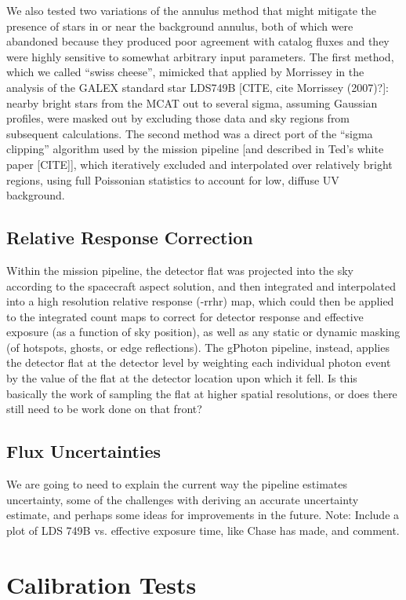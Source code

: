 \documentclass[5p]{elsarticle}
\begin{document}
We also tested two variations of the annulus method that might mitigate the presence of stars in or near the background annulus, both of which were abandoned because they produced poor agreement with catalog fluxes and they were highly sensitive to somewhat arbitrary input parameters. The first method, which we called ``swiss cheese'', mimicked that applied by {\color{red}Morrissey in the analysis of the GALEX standard star LDS749B [CITE, cite Morrissey (2007)?]}: nearby bright stars from the MCAT out to several sigma, assuming Gaussian profiles, were masked out by excluding those data and sky regions from subsequent calculations. The second method was a direct port of the ``sigma clipping'' algorithm used by the mission pipeline {\color{red}[and described in Ted's white paper [CITE]]}, which iteratively excluded and interpolated over relatively bright regions, using full Poissonian statistics to account for low, diffuse UV background.

\subsection{Relative Response Correction}
Within the mission pipeline, the detector flat was projected into the sky according to the spacecraft aspect solution, and then integrated and interpolated into a high resolution relative response (-rrhr) map, which could then be applied to the integrated count maps to correct for detector response and effective exposure (as a function of sky position), as well as any static or dynamic masking (of hotspots, ghosts, or edge reflections). The gPhoton pipeline, instead, applies the detector flat at the detector level by weighting each individual photon event by the value of the flat at the detector location upon which it fell.  {\color{red}Is this basically the work of sampling the flat at higher spatial resolutions, or does there still need to be work done on that front?}

\subsection{Flux Uncertainties}
{\color{red}We are going to need to explain the current way the pipeline estimates uncertainty, some of the challenges with deriving an accurate uncertainty estimate, and perhaps some ideas for improvements in the future.}
{\color{red}Note: Include a plot of LDS 749B vs. effective exposure time, like Chase has made, and comment.}

\section{Calibration Tests}
\label{calibration}
\end{document}
